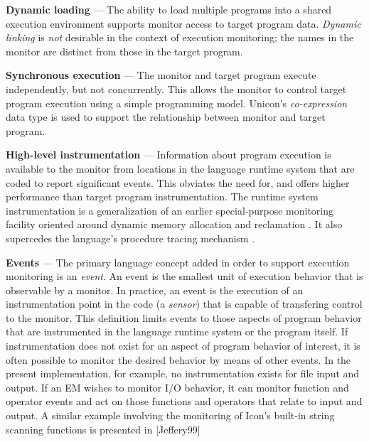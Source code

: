 \begin{list}{}{\itemsep 7pt}
\item [{\bf Dynamic loading}] --- The ability to load multiple programs
	into a shared execution environment supports
	monitor access to target program data.
	{\em Dynamic linking\/} is {\em not\/} desirable in the
	context of execution monitoring; the names in the
	monitor are distinct from those in the target program. 
\item [{\bf Synchronous execution}] --- The monitor and target program execute
	independently, but not concurrently.  This allows the monitor
	to control target program execution using a simple programming model.
	Unicon's {\em co-expression\/} data type is used to support the
	relationship between monitor and target program.
\item [{\bf High-level instrumentation}] --- Information
	about program execution is available to the monitor from
	locations in the language runtime system that are coded to report
	significant events.  This obviates the need for, and
	offers higher performance than target program
	instrumentation.  The runtime system instrumentation is a
	generalization of an earlier special-purpose
	monitoring facility oriented around dynamic memory allocation
	and reclamation \cite{Townsend89}.
	It also supercedes the language's procedure
	tracing mechanism \cite{Griswold97}.
\item [{\bf Events}] --- 
	The primary language concept added in order to support execution
	monitoring is an {\em event\/}.  An event is the smallest unit of
	execution behavior that is observable by a monitor.  In practice, an
	event is the execution of an instrumentation point in the code
	(a {\em sensor\/}) 
	that is capable of transfering control to the monitor.
	This definition limits events to those aspects of program behavior
	that are instrumented in the language runtime system or the program
	itself. If instrumentation
	does not exist for an aspect of program behavior of interest, it is
	often possible to monitor the desired behavior by means of other
	events. In the present implementation, for example, no instrumentation
	exists for file input and output.  If an EM wishes to monitor I/O
	behavior, it can monitor function and operator events and act on
	those functions and operators that relate to input and output.
	A similar example involving the monitoring of Icon's built-in
	string scanning functions is presented in [Jeffery99]


\end{list}
